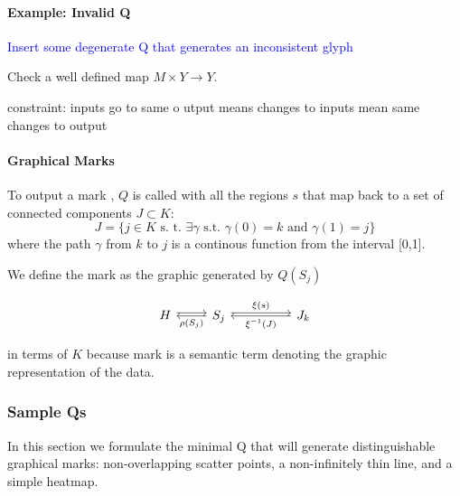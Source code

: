 \documentclass[../main.tex]{subfiles}
\begin{document}
\paragraph{Example: Invalid Q}
\textcolor{blue}{Insert some degenerate Q that generates an inconsistent glyph}


Check a well defined map $M\times Y \rightarrow Y$.


constraint: inputs go to same o
utput means changes to inputs mean same changes to output

\paragraph{Graphical Marks}
To output a mark  \cite{bertinIIPropertiesGraphic2011,carpendaleVisualRepresentationSemiology}, $Q$ is called with all the regions $s$ that map back to a set of connected components $J \subset K$:
\begin{equation}
J = \{j \in K \text{ s. t. } \exists \gamma \text{ s.t. } \gamma(0)=k \text{ and }\gamma(1)=j\}
\end{equation}
where the path\cite{ConnectedSpace2020}  $\gamma$ from $k$ to $j$ is a continous function from the interval [0,1].

We define the mark as the graphic generated by $Q(S_j)$

\begin{equation}
    \begin{tikzcd}
        H \arrow[r, shift left] & S_j \arrow[rr, "\xi(s)", shift left] \arrow[l, "\rho(S_j)"] &  & J_{k} \arrow[ll, "\xi^{-1}(J)"]
        \end{tikzcd}
    \label{eq:mark}
\end{equation}

in terms of $K$ because mark is a semantic term denoting the graphic representation of the data.

\subsubsection{Sample Qs}
In this section we formulate the minimal Q that will generate distinguishable graphical marks: non-overlapping scatter points, a non-infinitely thin line, and a simple heatmap. 
\end{document}
